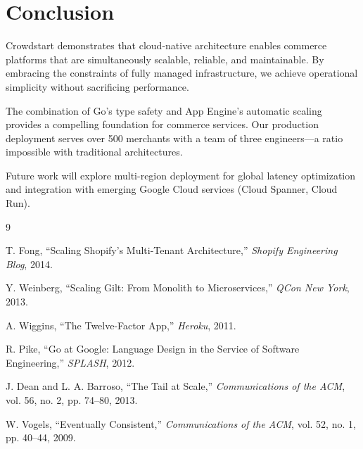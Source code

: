 \section{Conclusion}


Crowdstart demonstrates that cloud-native architecture enables commerce platforms that are simultaneously scalable, reliable, and maintainable. By embracing the constraints of fully managed infrastructure, we achieve operational simplicity without sacrificing performance.

The combination of Go's type safety and App Engine's automatic scaling provides a compelling foundation for commerce services. Our production deployment serves over 500 merchants with a team of three engineers—a ratio impossible with traditional architectures.

Future work will explore multi-region deployment for global latency optimization and integration with emerging Google Cloud services (Cloud Spanner, Cloud Run).

\begin{thebibliography}{9}

T. Fong, ``Scaling Shopify's Multi-Tenant Architecture,'' \textit{Shopify Engineering Blog}, 2014.

Y. Weinberg, ``Scaling Gilt: From Monolith to Microservices,'' \textit{QCon New York}, 2013.

A. Wiggins, ``The Twelve-Factor App,'' \textit{Heroku}, 2011.

R. Pike, ``Go at Google: Language Design in the Service of Software Engineering,'' \textit{SPLASH}, 2012.

J. Dean and L. A. Barroso, ``The Tail at Scale,'' \textit{Communications of the ACM}, vol. 56, no. 2, pp. 74--80, 2013.

W. Vogels, ``Eventually Consistent,'' \textit{Communications of the ACM}, vol. 52, no. 1, pp. 40--44, 2009.

\end{thebibliography}

